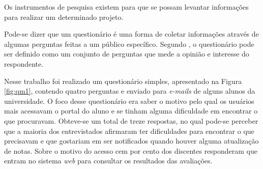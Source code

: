 
	\par Os instrumentos de pesquisa existem para que se possam levantar
informações para realizar um determinado projeto.

	\par Pode-se dizer que um questionário é uma forma de coletar
informações através de algumas perguntas feitas a um público específico.
Segundo , o questionário pode ser definido como
um conjunto de perguntas que mede a opinião e interesse do respondente.

	\par Nesse trabalho foi realizado um questionário simples, apresentado na Figura
\ref{fig:qm1}, contendo quatro perguntas e enviado para \textit{e-mails} de alguns
alunos da universidade. O foco desse questionário era saber o motivo pelo qual os
usuários mais acessavam o portal do aluno e se tinham alguma dificuldade em encontrar
o que procuravam. Obteve-se um total de treze respostas, no qual pode-se perceber que
a maioria dos entrevistados afirmaram ter dificuldades para encontrar o que precisavam
e que gostariam em ser notificados quando houver alguma atualização de notas. Sobre o
motivo do acesso cem por cento dos discentes responderam que entram no sistema \textit{web}
para consultar os resultados das avaliações.

